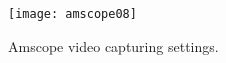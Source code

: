\begin{figure}[h]
	\centering
	\texttt{[image: amscope08]}
	\caption{Amscope video capturing settings.}
	\label{fig:am-cap}
\end{figure}


%
%
%
